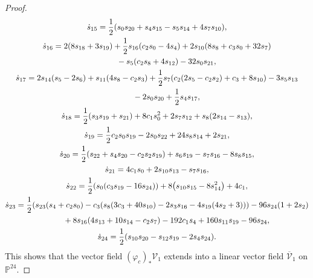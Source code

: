 \documentclass[pdftex]{sigma}
\numberwithin{equation}{section}
\begin{document}
\begin{proof}
\begin{gather*}
 \dot{s}_{15}= \frac{1}{2}(s_0s_{20}+s_4s_{15}-s_5s_{14}+4s_7s_{10}), \\
 \dot{s}_{16}= 2(8s_{18}+3s_{19})+\frac{1}{2}s_{16}(c_2s_0-4s_{4})+2s_{10}(8s_8+c_3s_0+32s_7) \\ \hphantom{\dot{s_{16}}=}{}
 -s_5(c_2s_8+4s_{12})-32s_0s_{21}, \\
 \dot{s}_{17}= 2s_{14}(s_{5}-2s_{6})+s_{11}(4s_{8}-c_2s_{3})+\frac{1}{2}s_{7}(c_2(2s_5-c_2s_2)+c_3+8s_{10})-3s_5s_{13} \\ \hphantom{\dot{s_{17}}=}{}
-2s_0s_{20}+\frac{1}{2}s_4s_{17} , \\
 \dot{s}_{18}= \frac{1}{2}(s_3s_{19}+s_{21})+8c_1s_0^2+2s_7s_{12}+s_8(2s_{14}-s_{13}), \\
 \dot{s}_{19}= \frac{1}{2}c_2s_0s_{19}-2s_0s_{22}+24s_8s_{14}+2s_{21} , \\
 \dot{s}_{20}= \frac{1}{2}(s_{22}+s_4s_{20}-c_2s_2s_{19})+s_6s_{19}-s_7s_{16}-8s_8s_{15}, \\
 \dot{s}_{21}= 4c_1s_0+2s_{10}s_{13}-s_7s_{16}, \\
 \dot{s}_{22}= \frac{1}{2}(s_0(c_3s_{19}-16s_{24}))+8\bigl(s_{10}s_{15}-8s_{14}^2\bigr)+4c_1, \\
 \dot{s}_{23}= \frac{1}{2}(s_{23}(s_4+c_2s_0)-c_3(s_{8}(3c_3+40s_{10})-2s_3s_{16}-4s_{19}(4s_2+3)))-96s_{24}(1+2s_2) \\ \hphantom{\dot{s_{23}}=}{}
 +8s_{16}(4s_{13}+10s_{14}-c_2s_7)-192c_1s_4+160s_{11}s_{19}-96s_{24}, \\
 \dot{s}_{24}= \frac{1}{2}(s_{10}s_{20}-s_{12}s_{19}-2s_4s_{24}).
\end{gather*}
This shows that the vector field
$(\varphi_c)_{\ast}\mathcal{V}_1$ extends into a linear
vector field $\overline{\mathcal{V}}_1$ on $\mathbb{P}^{24}$.
\end{proof}
\end{document}
